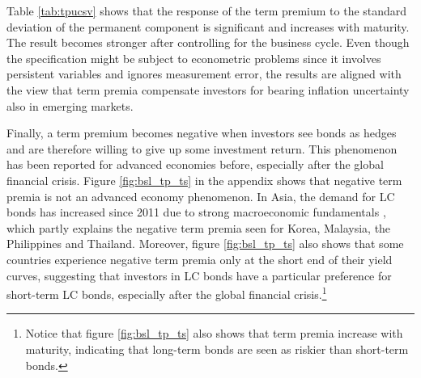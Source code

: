 {Table \ref{tab:tpucsv} shows that the response of the term premium to the standard deviation of the permanent component is significant %
and increases with maturity.
The result becomes stronger after controlling for the business cycle. 
Even though the specification might be subject to econometric problems since it involves persistent variables and ignores measurement error,
the results are %
aligned with the view that term premia compensate investors for bearing inflation uncertainty also in emerging markets.

Finally, a term premium becomes negative when investors see bonds as hedges and are therefore willing to give up some investment return. 
This phenomenon has been reported for advanced economies before, especially after the global financial crisis.
Figure \ref{fig:bsl_tp_ts} in the appendix shows that negative term premia is not an advanced economy phenomenon.
In Asia, the demand for LC bonds has increased since 2011 due to strong macroeconomic fundamentals \citep{IMFWB:2020}, which partly explains the negative term premia seen for Korea, Malaysia, the Philippines and Thailand.
Moreover,
figure \ref{fig:bsl_tp_ts} also shows that some countries experience negative term premia only at the short end of their yield curves, %
suggesting that %
investors in LC bonds %
have a particular preference for short-term LC bonds, especially after the global financial crisis.\footnote{ Notice that figure \ref{fig:bsl_tp_ts} also shows that term premia increase with maturity, indicating that long-term bonds are seen as riskier than short-term bonds.}
}
